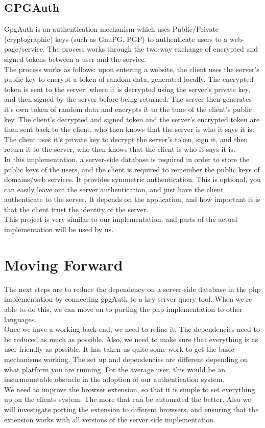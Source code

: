 \documentclass[11pt]{article}
\begin{document}
\subsection{GPGAuth} \label{subsec:gpgauth}
GpgAuth\cite{gpgauth} is an authentication mechanism which uses Public/Private (cryptographic) keys (such as GnuPG, PGP) to authenticate users to a web-page/service.  The process works through the two-way exchange of encrypted and signed tokens between a user and the service.\\
	The process works as follows: upon entering a website, the client uses the server's public key to encrypt a token of random data, generated locally.  The encrypted token is sent to the server, where it is decrypted using the server's private key, and then signed by the server before being returned.  The server then generates it's own token of random data and encrypts it to the tune of the client's public key.  The client's decrypted and signed token  and the server's encrypted token are then sent back to the client, who then knows that the server is who it says it is.  The client uses it's private key to decrypt the server's token, sign it, and then return it to the server, who then knows that the client is who it says it is.\\
	In this implementation, a server-side database is required in order to store the public keys of the users, and the client is required to remember the public keys of domains/web services. It provides symmetric authentication. This is optional, you can easily leave out the server authentication, and just have the client authenticate to the server. It depends on the application, and how important it is that the client trust the identity of the server.\\
	This project is very similar to our implementation, and parts of the actual implementation will be used by us.

\section{Moving Forward} \label{sec:future}
The next steps are to reduce the dependency on a server-side database in the php implementation by connecting gpgAuth to a key-server query tool.  When we're able to do this, we can move on to porting the php implementation to other languages.\\
Once we have a working back-end, we need to refine it. The dependencies need to be reduced as much as possible. Also, we need to make sure that everything is as user friendly as possible. It has taken us quite some work to get the basic mechanisms working. The set up and dependencies are different depending on what platform you are running. For the average user, this would be an insurmountable obstacle in the adoption of our authentication system.\\
We need to improve the browser extension, so that it is simple to set everything up on the clients system. The more that can be automated the better. Also we will investigate porting the extension to different browsers, and ensuring that the extension works with all versions of the server side implementation.


{}
\end{document}
